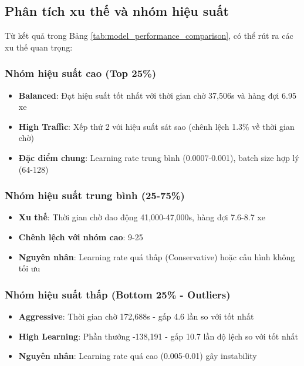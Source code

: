 \subsection{Phân tích xu thế và nhóm hiệu suất}

Từ kết quả trong Bảng \ref{tab:model_performance_comparison}, có thể rút ra các xu thế quan trọng:

\subsubsection{Nhóm hiệu suất cao (Top 25\%)}
\begin{itemize}
    \item \textbf{Balanced}: Đạt hiệu suất tốt nhất với thời gian chờ 37,506s và hàng đợi 6.95 xe
    \item \textbf{High Traffic}: Xếp thứ 2 với hiệu suất sát sao (chênh lệch 1.3\% về thời gian chờ)
    \item \textbf{Đặc điểm chung}: Learning rate trung bình (0.0007-0.001), batch size hợp lý (64-128)
\end{itemize}

\subsubsection{Nhóm hiệu suất trung bình (25-75\%)}
\begin{itemize}
    \item \textbf{Xu thế}: Thời gian chờ dao động 41,000-47,000s, hàng đợi 7.6-8.7 xe
    \item \textbf{Chênh lệch với nhóm cao}: 9-25%
    \item \textbf{Nguyên nhân}: Learning rate quá thấp (Conservative) hoặc cấu hình không tối ưu
\end{itemize}

\subsubsection{Nhóm hiệu suất thấp (Bottom 25\% - Outliers)}
\begin{itemize}
    \item \textbf{Aggressive}: Thời gian chờ 172,688s - gấp 4.6 lần so với tốt nhất
    \item \textbf{High Learning}: Phần thưởng -138,191 - gấp 10.7 lần độ lệch so với tốt nhất
    \item \textbf{Nguyên nhân}: Learning rate quá cao (0.005-0.01) gây instability
\end{itemize}

